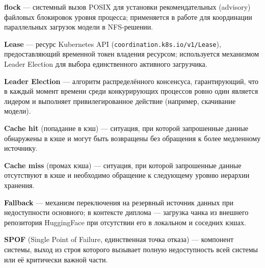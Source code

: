 \begin{sloppypar}
\textbf{flock} --- системный вызов POSIX для установки рекомендательных (advisory) файловых блокировок уровня процесса; применяется в работе для координации параллельных загрузок модели в NFS-решении.

\textbf{Lease} --- ресурс Kubernetes API (\texttt{coordination.k8s.io/v1/Lease}), предоставляющий временной токен владения ресурсом; используется механизмом Leader Election для выбора единственного активного загрузчика.

\textbf{Leader Election} --- алгоритм распределённого консенсуса, гарантирующий, что в каждый момент времени среди конкурирующих процессов ровно один является лидером и выполняет привилегированное действие (например, скачивание модели).

\textbf{Cache hit} (попадание в кэш) --- ситуация, при которой запрошенные данные обнаружены в кэше и могут быть возвращены без обращения к более медленному источнику.

\textbf{Cache miss} (промах кэша) --- ситуация, при которой запрошенные данные отсутствуют в кэше и необходимо обращение к следующему уровню иерархии хранения.

\textbf{Fallback} --- механизм переключения на резервный источник данных при недоступности основного; в контексте диплома --- загрузка чанка из внешнего репозитория HuggingFace при отсутствии его в локальном и соседних кэшах.

\textbf{SPOF} (Single Point of Failure, единственная точка отказа) --- компонент системы, выход из строя которого вызывает полную недоступность всей системы или её критически важной части.

\end{sloppypar}
